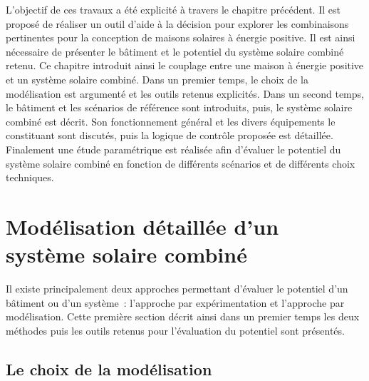 

L’objectif de ces travaux a été explicité à travers le chapitre précédent. Il est proposé
de réaliser un outil d’aide à la décision pour explorer les combinaisons pertinentes pour
la conception de maisons solaires à énergie positive. Il est ainsi nécessaire de
présenter le bâtiment et le potentiel du système solaire combiné retenu. Ce chapitre
introduit ainsi le couplage entre une maison à énergie positive et un système solaire
combiné. Dans un premier temps, le choix de la modélisation est argumenté et les outils
retenus explicités. Dans un second temps, le bâtiment et les scénarios de référence sont
introduits, puis, le système solaire combiné est décrit. Son fonctionnement général et les
divers équipements le constituant sont discutés, puis la logique de contrôle proposée est
détaillée. Finalement une étude paramétrique est réalisée afin d’évaluer le potentiel du
système solaire combiné en fonction de différents scénarios et de différents choix
techniques.
\clearpage


\section{Modélisation détaillée d’un système solaire combiné} %
\label{sec:modelisatioe_detaillee_d_un_systeme_solaire_combine}
Il existe principalement deux approches permettant d’évaluer le potentiel d’un bâtiment ou
d’un système~: l’approche par expérimentation et l’approche par modélisation. Cette
première section décrit ainsi dans un premier temps les deux méthodes puis les outils
retenus pour l’évaluation du potentiel sont présentés.

\subsection{Le choix de la modélisation} %
\label{sub:le_choix_de_la_modelisation}
